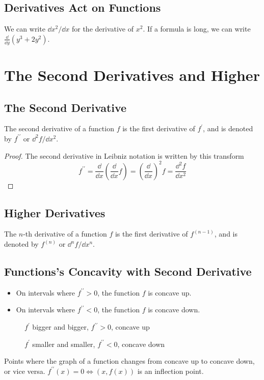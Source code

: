 \subsection{Derivatives Act on Functions}
We can write $\dd x^2/\dd x$ for the derivative of $x^2$. If a formula is long, we can write $\frac\dd{\dd y}(y^3+2y^2)$.


\section{The Second Derivatives and Higher}
\subsection{The Second Derivative}
The second derivative of a function $f$ is the first derivative of $f^\prime$, and is denoted by $f^{\prime\prime}$ or $\dd^2 f/\dd x^2$.
\begin{proof}
  The second derivative in Leibniz notation is written by this transform
  \[
  f^{\prime\prime}
  =\frac\dd{\dd x}\left(\frac\dd{\dd x}f\right)
  =\left(\frac\dd{\dd x}\right)^2 f
  =\frac{\dd^2 f}{\dd x^2}
  \]
\end{proof}

\subsection{Higher Derivatives}
The $n$-th derivative of a function $f$ is the first derivative of $f^{(n-1)}$, and is denoted by $f^{(n)}$ or $\dd^n f/\dd x^n$.

\subsection{Functions's Concavity with Second Derivative}
\begin{itemize}
\item On intervals where $f^{\prime\prime}>0$, the function $f$ is concave up.
\item On intervals where $f^{\prime\prime}<0$, the function $f$ is concave down.
\end{itemize}
\begin{figure}[H]
  \centering
  \caption{$f^\prime$ bigger and bigger, $f^{\prime\prime}>0$, concave up}
\end{figure}
\begin{figure}[H]
  \centering
  \caption{$f^\prime$ smaller and smaller, $f^{\prime\prime}<0$, concave down}
\end{figure}
\begin{definition}
Points where the graph of a function changes from concave up to concave down, or vice versa. $f^{\prime\prime}(x)=0\iff(x,f(x))$ is an inflection point.
\end{definition}


